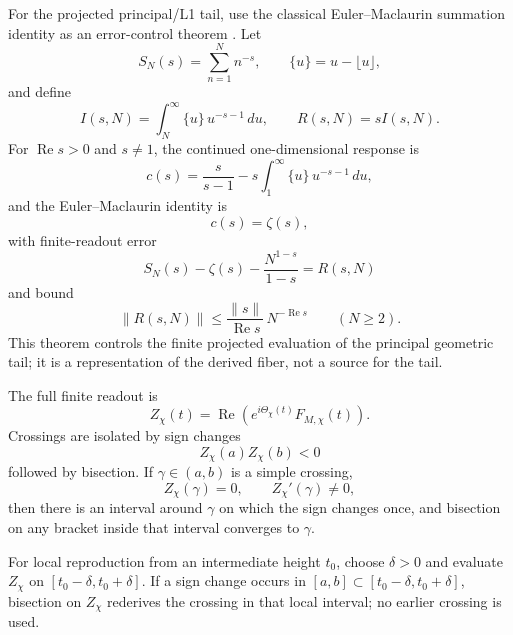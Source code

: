 \documentclass[11pt]{article}
\DeclareMathOperator{\Ree}{Re}
\begin{document}
For the projected principal/L1 tail, use the classical Euler--Maclaurin
summation identity as an error-control theorem \cite{WhittakerWatson1927}.
Let
\[
  S_N(s)=\sum_{n=1}^{N}n^{-s},\qquad \{u\}=u-\lfloor u\rfloor ,
\]
and define
\[
  I(s,N)=\int_N^\infty \{u\}\,u^{-s-1}\,du,\qquad
  R(s,N)=sI(s,N).
\]
For $\Ree s>0$ and $s\ne1$, the continued one-dimensional response is
\[
  c(s)
  =
  \frac{s}{s-1}
  -
  s\int_1^\infty \{u\}\,u^{-s-1}\,du,
\]
and the Euler--Maclaurin identity is
\[
  c(s)=\zeta(s),
\]
with finite-readout error
\[
  S_N(s)-\zeta(s)-\frac{N^{1-s}}{1-s}=R(s,N)
\]
and bound
\[
  \|R(s,N)\|
  \le
  \frac{\|s\|}{\Ree s}\,N^{-\Ree s}
  \qquad (N\ge2).
\]
This theorem controls the finite projected evaluation of the principal
geometric tail; it is a representation of the derived fiber, not a source for
the tail.

The full finite readout is
\[
  Z_\chi(t)=\Ree(e^{i\Theta_\chi(t)}F_{M,\chi}(t)).
\]
Crossings are isolated by sign changes
\[
  Z_\chi(a)Z_\chi(b)<0
\]
followed by bisection.  If $\gamma\in(a,b)$ is a simple crossing,
\[
  Z_\chi(\gamma)=0,\qquad Z_\chi'(\gamma)\ne0,
\]
then there is an interval around $\gamma$ on which the sign changes once, and
bisection on any bracket inside that interval converges to $\gamma$.

For local reproduction from an intermediate height $t_0$, choose $\delta>0$ and
evaluate $Z_\chi$ on $[t_0-\delta,t_0+\delta]$.  If a sign change occurs in
$[a,b]\subset[t_0-\delta,t_0+\delta]$, bisection on $Z_\chi$ rederives the
crossing in that local interval; no earlier crossing is used.



\end{document}
